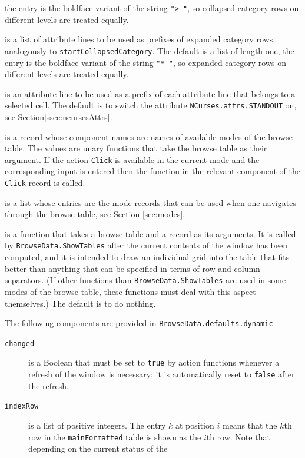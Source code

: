 \documentclass[a4paper,11pt]{report}
\begin{document}
{{{\begin{description}
the entry is the boldface variant of the string \texttt{"{\textgreater} "}, so collapsed category rows on different levels are treated equally. 
\item[{\texttt{startExpandedCategory}}]  is a list of attribute lines to be used as prefixes of expanded category rows,
analogously to \texttt{startCollapsedCategory}. The default is a list of length one, the entry is the boldface variant of
the string \texttt{"* "}, so expanded category rows on different levels are treated equally. 
\item[{\texttt{startSelect}}]  is an attribute line to be used as a prefix of each attribute line that
belongs to a selected cell. The default is to switch the attribute \texttt{NCurses.attrs.STANDOUT} on, see Section{\nobreakspace}\ref{ssec:ncursesAttrs}. 
\item[{\texttt{Click}}]  is a record whose component names are names of available modes of the browse
table. The values are unary functions that take the browse table as their
argument. If the action \texttt{Click} is available in the current mode and the corresponding input is entered then
the function in the relevant component of the \texttt{Click} record is called. 
\item[{\texttt{availableModes}}]  is a list whose entries are the mode records that can be used when one
navigates through the browse table, see Section \ref{sec:modes}. 
\item[{\texttt{SpecialGrid}}]  is a function that takes a browse table and a record as its arguments. It is
called by \texttt{BrowseData.ShowTables} after the current contents of the window has been computed, and it is intended
to draw an individual grid into the table that fits better than anything that
can be specified in terms of row and column separators. (If other functions
than \texttt{BrowseData.ShowTables} are used in some modes of the browse table, these functions must deal with
this aspect themselves.) The default is to do nothing. 
\end{description}
  The following components are provided in \texttt{BrowseData.defaults.dynamic}. 
\begin{description}
\item[{\texttt{changed}}]  is a Boolean that must be set to \texttt{true} by action functions whenever a refresh of the window is necessary; it is
automatically reset to \texttt{false} after the refresh. 
\item[{\texttt{indexRow}}]  is a list of positive integers. The entry $k$ at position $i$ means that the $k$\texttt{}th row in the \texttt{mainFormatted} table is shown as the $i$\texttt{}th row. Note that depending on the current status of the

\end{description}}}}
\end{document}
